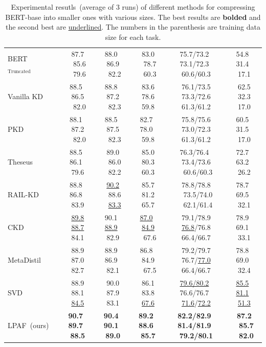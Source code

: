\begin{table}[thb!]
\begin{tabular}{l|c|ccccc}
		BERT$_{\text{Truncated}}$ &  & 87.7 ~85.6 ~79.6          & 88.0~ 86.9 ~82.2          & 83.0 ~78.7 ~60.3          & 75.7/73.2~ 73.1/72.3~ 60.6/60.3          & 54.8~ 31.4~ 17.1          \\
		Vanilla KD     &    & 88.5~ 86.5 ~82.0           & 88.8~ 87.2 ~82.3          & 83.6 ~78.6~ 59.8          & 76.1/73.5 ~73.3/72.6~ 61.3/61.2          & 62.5 ~32.3~ 17.0          \\
		PKD    &    & 88.1~ 87.2 ~82.0          & 88.5~ 87.5 ~82.3          & 82.7~ 78.0~ 59.8          & 75.8/75.6 ~73.0/72.3~ 61.3/61.2          &60.5~ 31.5~ 17.0                                                      \\
		Theseus &  & 88.5~ 86.1~ 79.6          & 89.0 ~86.0 ~82.2          & 85.0 ~80.3~ 60.3          & 76.3/76.4~ 73.4/73.6 ~60.6/60.3          &72.7~ 63.2~ 26.2                                                      \\
		RAIL-KD     &   & 88.8~ 86.8~ 83.9          &\underline{90.2} ~88.6 ~\underline{83.3}          &85.7 ~81.2~ 65.7          &78.8/78.8 ~73.5/74.0 ~62.1/61.4          &78.7~ 69.5~ 32.1                                                      \\
		CKD   &     & \underline{89.8} ~\underline{88.7}~ 84.1          & 90.1~ \underline{88.9}~ 82.9          & \underline{87.0}~ \underline{84.9} ~67.6          & 79.1/78.9 ~\underline{76.8}/76.8~ 66.4/66.7          &78.9~ 69.1~ 33.1                                                      \\
		MetaDistil  &      & 88.9 ~87.0~ 82.7          & 88.9~ 86.9~ 82.1          & 86.8~ 84.9 ~67.5          & 79.2/79.7 ~76.7/\underline{77.0}~ 66.4/66.7          &78.8~ 69.0~ 32.4                                                      \\
		\midrule
		SVD   &    & 88.9 ~88.1~ \underline{84.5}         & 90.0 ~87.9~ 83.1          & 86.1 ~83.8~ \underline{67.6}          & \underline{79.6/80.2}~ 76.6/76.7~ \underline{71.6}/\underline{72.2}          & \underline{85.5}~ \underline{81.1}~ \underline{51.3}          \\

		LPAF~(ours)   &     & \textbf{90.7~ 89.7~ 88.5} & \textbf{90.4}~ \textbf{90.1}~ \textbf{89.0} & \textbf{89.2~ 88.6~ 85.7} & \textbf{82.2/82.9}~ \textbf{81.4/81.9}~ \textbf{79.2/80.1} & \textbf{87.2 ~85.7 ~82.0} \\
		\bottomrule
	\end{tabular}
	\caption{Experimental resutls~(average of 3 runs) of different methods for compressing BERT-base into smaller ones with various sizes. The best results are \textbf{bolded} and the second best are \underline{underlined}. The numbers in the parenthesis are training data size for each task.}
	\label{table:all}
\end{table}




